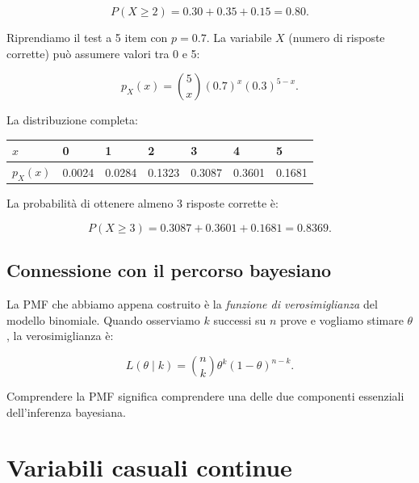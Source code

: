\documentclass[
  italian,
  letterpaper,
  a4paper,
  11pt,
  open=any]{scrbook}
\newcounter{none} %
\theoremstyle{plain}
\theoremstyle{definition}
\theoremstyle{definition}
\theoremstyle{remark}
\begin{document}
\[
P(X \geq 2) = 0.30 + 0.35 + 0.15 = 0.80.
\]

\begin{tcolorbox}[enhanced jigsaw, arc=.35mm, bottomrule=.15mm, bottomtitle=1mm, breakable, colback=white, colbacktitle=quarto-callout-note-color!10!white, colframe=quarto-callout-note-color-frame, coltitle=black, left=2mm, leftrule=.75mm, opacityback=0, opacitybacktitle=0.6, rightrule=.15mm, title=\textcolor{quarto-callout-note-color}{\faInfo}\hspace{0.5em}{Esempio: PMF del punteggio in un test a 5 item}, titlerule=0mm, toprule=.15mm, toptitle=1mm]

Riprendiamo il test a 5 item con \(p = 0.7\). La variabile \(X\) (numero
di risposte corrette) può assumere valori tra 0 e 5:

\[
p_X(x) = \binom{5}{x} (0.7)^x (0.3)^{5-x}.
\]

La distribuzione completa:

{\def\LTcaptype{none} %
\begin{longtable}[]{@{}lllllll@{}}
\toprule\noalign{}
\(x\) & 0 & 1 & 2 & 3 & 4 & 5 \\
\midrule\noalign{}
\endhead
\bottomrule\noalign{}
\endlastfoot
\(p_X(x)\) & 0.0024 & 0.0284 & 0.1323 & 0.3087 & 0.3601 & 0.1681 \\
\end{longtable}
}

La probabilità di ottenere almeno 3 risposte corrette è:

\[
P(X \geq 3) = 0.3087 + 0.3601 + 0.1681 = 0.8369.
\]

\end{tcolorbox}

\subsection{Connessione con il percorso
bayesiano}\label{connessione-con-il-percorso-bayesiano}

La PMF che abbiamo appena costruito è la \emph{funzione di
verosimiglianza} del modello binomiale. Quando osserviamo \(k\) successi
su \(n\) prove e vogliamo stimare \(\theta\), la verosimiglianza è:

\[
L(\theta \mid k) = \binom{n}{k} \theta^k (1-\theta)^{n-k}.
\]

Comprendere la PMF significa comprendere una delle due componenti
essenziali dell'inferenza bayesiana.

\section{Variabili casuali
continue}\label{sec-continuous-random-variables}
\end{document}
